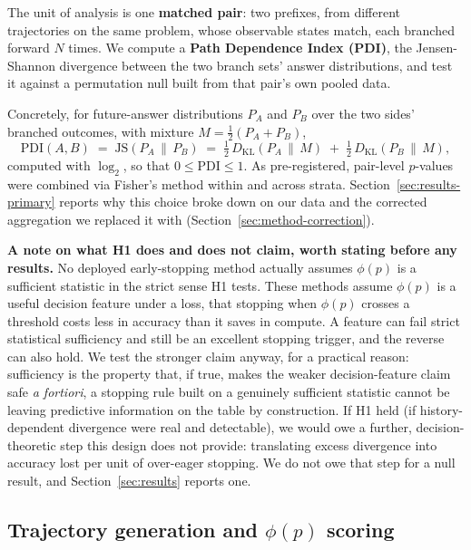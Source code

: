 \documentclass{article}
\begin{document}
The unit of analysis is one \textbf{matched pair}: two prefixes, from different trajectories on the same problem, whose observable states match, each branched forward $N$ times. We compute a \textbf{Path Dependence Index (PDI)}, the Jensen-Shannon divergence between the two branch sets' answer distributions, and test it against a permutation null built from that pair's own pooled data.

Concretely, for future-answer distributions $P_A$ and $P_B$ over the two sides' branched outcomes, with mixture $M = \tfrac{1}{2}(P_A + P_B)$,
\begin{equation}
\label{eq:pdi}
\text{PDI}(A,B) \;=\; \text{JS}(P_A \,\|\, P_B) \;=\; \tfrac{1}{2}\, D_{\mathrm{KL}}(P_A \,\|\, M) \;+\; \tfrac{1}{2}\, D_{\mathrm{KL}}(P_B \,\|\, M),
\end{equation}
computed with $\log_2$, so that $0 \le \text{PDI} \le 1$. As pre-registered, pair-level $p$-values were combined via Fisher's method within and across strata. Section~\ref{sec:results-primary} reports why this choice broke down on our data and the corrected aggregation we replaced it with (Section~\ref{sec:method-correction}).

\textbf{A note on what H1 does and does not claim, worth stating before any results.} No deployed early-stopping method actually assumes $\phi(p)$ is a sufficient statistic in the strict sense H1 tests. These methods assume $\phi(p)$ is a useful decision feature under a loss, that stopping when $\phi(p)$ crosses a threshold costs less in accuracy than it saves in compute. A feature can fail strict statistical sufficiency and still be an excellent stopping trigger, and the reverse can also hold. We test the stronger claim anyway, for a practical reason: sufficiency is the property that, if true, makes the weaker decision-feature claim safe \emph{a fortiori}, a stopping rule built on a genuinely sufficient statistic cannot be leaving predictive information on the table by construction. If H1 held (if history-dependent divergence were real and detectable), we would owe a further, decision-theoretic step this design does not provide: translating excess divergence into accuracy lost per unit of over-eager stopping. We do not owe that step for a null result, and Section~\ref{sec:results} reports one.

\subsection{Trajectory generation and $\phi(p)$ scoring}
\label{sec:method-traj}
\end{document}
